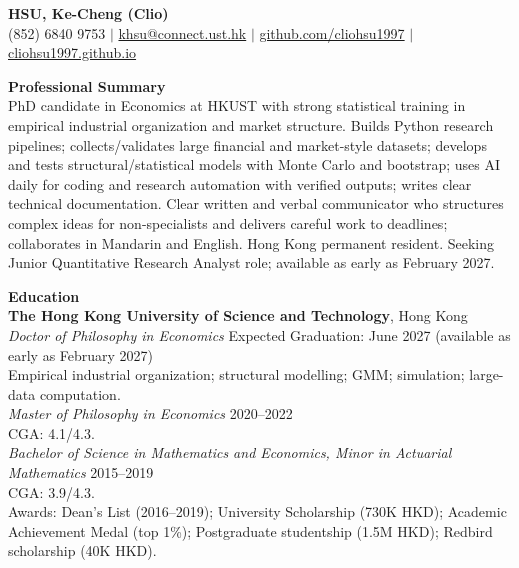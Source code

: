 \documentclass[11pt,letterpaper]{article}
\begin{document}
{\Large \textbf{HSU, Ke-Cheng (Clio)}}\\[1pt]
(852) 6840 9753 \quad $|$ \quad \href{mailto:khsu@connect.ust.hk}{khsu@connect.ust.hk} \quad $|$ \quad \href{https://github.com/cliohsu1997}{github.com/cliohsu1997} \quad $|$ \quad \href{https://cliohsu1997.github.io/}{cliohsu1997.github.io}

\vspace{0.15pt}

{\large \textbf{Professional Summary}}\\[-0.5pt]
PhD candidate in Economics at HKUST with strong statistical training in empirical industrial organization and market structure. Builds Python research pipelines; collects/validates large financial and market-style datasets; develops and tests structural/statistical models with Monte Carlo and bootstrap; uses AI daily for coding and research automation with verified outputs; writes clear technical documentation. Clear written and verbal communicator who structures complex ideas for non-specialists and delivers careful work to deadlines; collaborates in Mandarin and English. Hong Kong permanent resident. Seeking Junior Quantitative Research Analyst role; available as early as February 2027.

\vspace{0.15pt}

{\large \textbf{Education}}\\[-0.5pt]
\textbf{The Hong Kong University of Science and Technology}, Hong Kong\\
\textit{Doctor of Philosophy in Economics} \hfill Expected Graduation: June 2027 (available as early as February 2027)\\
Empirical industrial organization; structural modelling; GMM; simulation; large-data computation.\\
\textit{Master of Philosophy in Economics} \hfill 2020--2022\\
CGA: 4.1/4.3.\\
\textit{Bachelor of Science in Mathematics and Economics, Minor in Actuarial Mathematics} \hfill 2015--2019\\
CGA: 3.9/4.3.\\
Awards: Dean's List (2016--2019); University Scholarship (730K HKD); Academic Achievement Medal (top 1\%); Postgraduate studentship (1.5M HKD); Redbird scholarship (40K HKD).

\vspace{0.15pt}
\end{document}
